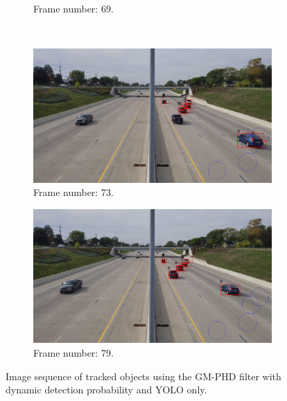 \begin{figure}[H]
\begin{subfigure}{0.48\textwidth}
        \caption{Frame number: 69.}
        \label{fig:E1-V1-S1:06}
    \end{subfigure}
    \\
    \begin{subfigure}{0.48\textwidth}
        \centering
        \includegraphics[width=\linewidth]{../../../experiments/E1/V1/YOLO/73}
        \caption{Frame number: 73.}
        \label{fig:E1-V1-S1:07}
    \end{subfigure}
    \begin{subfigure}{0.48\textwidth}
        \centering
        \includegraphics[width=\linewidth]{../../../experiments/E1/V1/YOLO/79}
        \caption{Frame number: 79.}
        \label{fig:E1-V1-S1:08}
    \end{subfigure}
    \caption{Image sequence of tracked objects using the GM-PHD filter with dynamic detection probability and YOLO
    only.}
    \label{fig:E1-V1-S1}
\end{figure}







